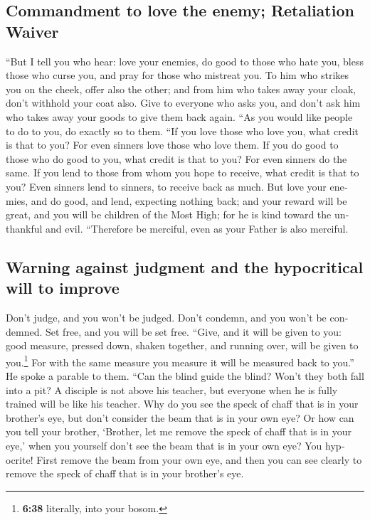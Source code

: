 \begin{paracol}{2}
\begin{otherlanguage}{english}
\hypertarget{commandment-to-love-the-enemy-retaliation-waiver}{%
\subsection{Commandment to love the enemy; Retaliation
Waiver}\label{commandment-to-love-the-enemy-retaliation-waiver}}

 ``But I tell you who hear: love your enemies, do good to
those who hate you,  bless those who curse you, and pray
for those who mistreat you.  To him who strikes you on
the cheek, offer also the other; and from him who takes away your cloak,
don't withhold your coat also.  Give to everyone who asks
you, and don't ask him who takes away your goods to give them back
again.  ``As you would like people to do to you, do
exactly so to them.  ``If you love those who love you,
what credit is that to you? For even sinners love those who love them.
 If you do good to those who do good to you, what credit
is that to you? For even sinners do the same.  If you
lend to those from whom you hope to receive, what credit is that to you?
Even sinners lend to sinners, to receive back as much. 
But love your enemies, and do good, and lend, expecting nothing back;
and your reward will be great, and you will be children of the Most
High; for he is kind toward the unthankful and evil. 
``Therefore be merciful, even as your Father is also merciful.

\hypertarget{warning-against-judgment-and-the-hypocritical-will-to-improve}{%
\subsection{Warning against judgment and the hypocritical will to
improve}\label{warning-against-judgment-and-the-hypocritical-will-to-improve}}

 Don't judge, and you won't be judged. Don't condemn, and
you won't be condemned. Set free, and you will be set free.
 ``Give, and it will be given to you: good measure,
pressed down, shaken together, and running over, will be given to
you.\footnote{\textbf{6:38} literally, into your bosom.} For with the
same measure you measure it will be measured back to you.''
 He spoke a parable to them. ``Can the blind guide the
blind? Won't they both fall into a pit?  A disciple is
not above his teacher, but everyone when he is fully trained will be
like his teacher.  Why do you see the speck of chaff that
is in your brother's eye, but don't consider the beam that is in your
own eye?  Or how can you tell your brother, `Brother, let
me remove the speck of chaff that is in your eye,' when you yourself
don't see the beam that is in your own eye? You hypocrite! First remove
the beam from your own eye, and then you can see clearly to remove the
speck of chaff that is in your brother's eye.


\end{otherlanguage}
\end{paracol}
